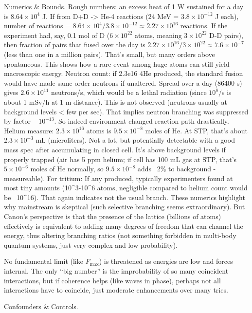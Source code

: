 \documentclass[11pt]{article}
\begin{document}
Numerics & Bounds. Rough numbers: an excess heat of 1 W sustained for a day is $8.64\times10^4$ J. If from D+D -> He-4 reactions (24 MeV = $3.8\times10^{-12}$ J each), number of reactions = $8.64\times10^4 / 3.8\times10^{-12} \approx 2.27\times10^{16}$ reactions. If the experiment had, say, 0.1 mol of D ($6\times10^{22}$ atoms, meaning $3\times10^{22}$ D-D pairs), then fraction of pairs that fused over the day is $2.27\times10^{16}/3\times10^{22} \approx 7.6\times10^{-7}$ (less than one in a million pairs). That’s small, but many orders above spontaneous. This shows how a rare event among huge atoms can still yield macroscopic energy. Neutron count: if 2.3e16 4He produced, the standard fusion would have made same order neutrons if unaltered. Spread over a day (86400 s) gives $2.6\times10^{11}$ neutrons/s, which would be a lethal radiation (since $10^8$/s is about 1 mSv/h at 1 m distance). This is not observed (neutrons usually at background levels < few per sec). That implies neutron branching was suppressed by factor ~ $10^{-13}$. So indeed environment changed reaction path drastically. Helium measure: $2.3\times10^{16}$ atoms is $9.5\times10^{-8}$ moles of He. At STP, that’s about $2.3\times10^{-3}$ mL (microliters). Not a lot, but potentially detectable with a good mass spec after accumulating in closed cell. It’s above background levels if properly trapped (air has 5 ppm helium; if cell has 100 mL gas at STP, that's $5\times10^{-6}$ moles of He normally, so $9.5\times10^{-8}$ adds ~2\% to background - measureable). For tritium: If any produced, typically experimenters found at most tiny amounts (10^3-10^6 atoms, negligible compared to helium count would be ~10^16). That again indicates not the usual branch. These numerics highlight why mainstream is skeptical (such selective branching seems extraordinary). But Canon’s perspective is that the presence of the lattice (billions of atoms) effectively is equivalent to adding many degrees of freedom that can channel the energy, thus altering branching ratios (not something forbidden in multi-body quantum systems, just very complex and low probability).

No fundamental limit (like $F_{\max}$) is threatened as energies are low and forces internal. The only “big number” is the improbability of so many coincident interactions, but if coherence helps (like waves in phase), perhaps not all interactions have to coincide, just moderate enhancements over many tries.


Confounders & Controls.
\end{document}

